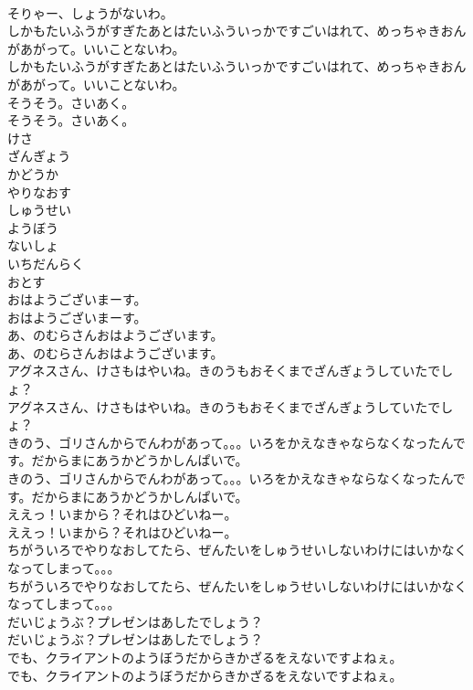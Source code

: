 \documentclass[8pt]{extreport}
\begin{document}
\begin{CJK}{UTF8}{min}
\\	そりゃー、しょうがないわ。
\\	しかもたいふうがすぎたあとはたいふういっかですごいはれて、めっちゃきおんがあがって。いいことないわ。
\\	しかもたいふうがすぎたあとはたいふういっかですごいはれて、めっちゃきおんがあがって。いいことないわ。
\\	そうそう。さいあく。
\\	そうそう。さいあく。
\\	けさ
\\	ざんぎょう
\\	かどうか
\\	やりなおす
\\	しゅうせい
\\	ようぼう
\\	ないしょ
\\	いちだんらく
\\	おとす
\\	おはようございまーす。
\\	おはようございまーす。
\\	あ、のむらさんおはようございます。
\\	あ、のむらさんおはようございます。
\\	アグネスさん、けさもはやいね。きのうもおそくまでざんぎょうしていたでしょ？
\\	アグネスさん、けさもはやいね。きのうもおそくまでざんぎょうしていたでしょ？
\\	きのう、ゴリさんからでんわがあって。。。いろをかえなきゃならなくなったんです。だからまにあうかどうかしんぱいで。
\\	きのう、ゴリさんからでんわがあって。。。いろをかえなきゃならなくなったんです。だからまにあうかどうかしんぱいで。
\\	ええっ！いまから？それはひどいねー。
\\	ええっ！いまから？それはひどいねー。
\\	ちがういろでやりなおしてたら、ぜんたいをしゅうせいしないわけにはいかなくなってしまって。。。
\\	ちがういろでやりなおしてたら、ぜんたいをしゅうせいしないわけにはいかなくなってしまって。。。
\\	だいじょうぶ？プレゼンはあしたでしょう？
\\	だいじょうぶ？プレゼンはあしたでしょう？
\\	でも、クライアントのようぼうだからきかざるをえないですよねぇ。
\\	でも、クライアントのようぼうだからきかざるをえないですよねぇ。

\end{CJK}
\end{document}
